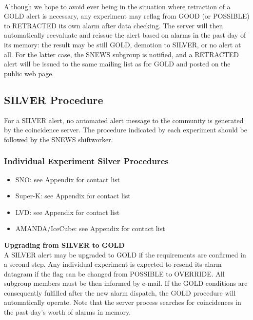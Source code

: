 \documentclass{article}
\begin{document}
\\ Although we hope
to avoid ever being in the situation where retraction of a GOLD alert
is necessary, any experiment may reflag from GOOD (or POSSIBLE) to RETRACTED its
own alarm after data checking.  The server will then automatically
reevaluate and reissue the alert based on alarms in the past day of its
memory: the result may be still GOLD, demotion to SILVER, or no alert
at all.  For the latter case, the SNEWS subgroup is 
notified, and a RETRACTED alert will be issued to the
same mailing list as for GOLD and posted on the public web page.

\subsection{SILVER Procedure}\label{SILVER}
For a SILVER alert, no automated alert message to the community
is generated by the coincidence server. 
The procedure indicated by each experiment should be followed by
the SNEWS shiftworker.\\

\subsubsection{Individual Experiment Silver Procedures}

\begin{itemize}

\item SNO: see Appendix for contact list
\item Super-K: see Appendix for contact list
\item LVD: see Appendix for contact list
\item AMANDA/IceCube: see Appendix for contact list

\end{itemize}


\noindent \textbf{Upgrading from SILVER to GOLD}\\
A SILVER alert may be upgraded to GOLD if the requirements are
confirmed in a second step. Any individual experiment is expected to
resend its alarm datagram if the flag can be changed from POSSIBLE to
OVERRIDE. All subgroup members must be then informed by
e-mail. If the GOLD conditions are consequently fulfilled after the
new alarm dispatch, the GOLD procedure will automatically operate.
Note that the server process searches for coincidences
in the past day's worth of alarms in memory.
\end{document}
